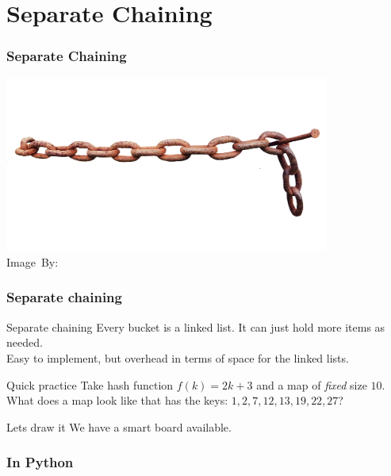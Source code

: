 \section{Separate Chaining}%
\label{sec:separate_chaining}

\begin{frame}
	\frametitle{Separate Chaining}
	\begin{center}
		\includegraphics[width=0.8\textwidth]{figures/chains.png}\\
		\hspace*{15pt}\hbox{\scriptsize Image By:}
	\end{center}
\end{frame}

\begin{frame}
	\frametitle{Separate chaining}
		\begin{block}{Separate chaining}
			Every bucket is a linked list. It can just hold more items as needed.\\
			Easy to implement, but overhead in terms of space for the linked lists.
		\end{block}	
		\pause
		\begin{questionblock}{Quick practice}
		  Take hash function $f(k) = 2k + 3$ and a map of \textit{fixed} size $10$. What does a map look like that has the
			keys: $1,2,7,12,13,19,22,27$?
		\end{questionblock}
		\pause
		\begin{answerblock}{Lets draw it}
			We have a smart board available.
		\end{answerblock}
\end{frame}

\begin{frame}
	\frametitle{In Python}
	
\end{frame}
